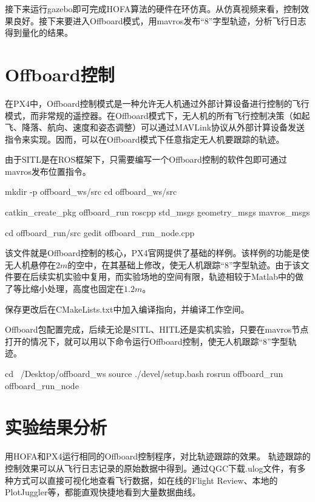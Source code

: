 接下来运行gazebo即可完成HOFA算法的硬件在环仿真。从仿真视频来看，控制效果良好。接下来要进入Offboard模式，用mavros发布“8”字型轨迹，分析飞行日志得到量化的结果。

\section{Offboard控制}

在PX4中，Offboard控制模式是一种允许无人机通过外部计算设备进行控制的飞行模式，而非常规的遥控器。在Offboard模式下，无人机的所有飞行控制决策（如起飞、降落、航向、速度和姿态调整）可以通过MAVLink协议从外部计算设备发送指令来实现。因而，可以在Offboard模式下任意指定无人机要跟踪的轨迹。

由于SITL是在ROS框架下，只需要编写一个Offboard控制的软件包即可通过mavros发布位置指令。
\begin{codeblock}[language=C]
  mkdir -p offboard_ws/src
  cd offboard_ws/src

  catkin_create_pkg offboard_run roscpp std_msgs geometry_msgs mavros_msgs
  
  cd offboard_run/src
  gedit offboard_run_node.cpp
\end{codeblock}

该文件就是Offboard控制的核心，PX4官网提供了基础的样例\cite{Offboard}。该样例的功能是使无人机悬停在$2m$的空中，在其基础上修改，使无人机跟踪“8”字型轨迹。由于该文件要在后续实机实验中复用，而实验场地的空间有限，轨迹相较于Matlab中的做了等比缩小处理，高度也固定在$1.2m$。

保存更改后在CMakeLists.txt中加入编译指向，并编译工作空间。


  
Offboard包配置完成，后续无论是SITL、HITL还是实机实验，只要在mavros节点打开的情况下，就可以用以下命令运行Offboard控制，使无人机跟踪“8”字型轨迹。
\begin{codeblock}[language=C]
  cd ~/Desktop/offboard_ws
  source ./devel/setup.bash
  rosrun offboard_run offboard_run_node
\end{codeblock}


\section{实验结果分析}
用HOFA和PX4运行相同的Offboard控制程序，对比轨迹跟踪的效果。
轨迹跟踪的控制效果可以从飞行日志记录的原始数据中得到。通过QGC下载.ulog文件，有多种方式可以直接可视化地查看飞行数据，如在线的Flight Review、本地的PlotJuggler等，都能直观快捷地看到大量数据曲线。

